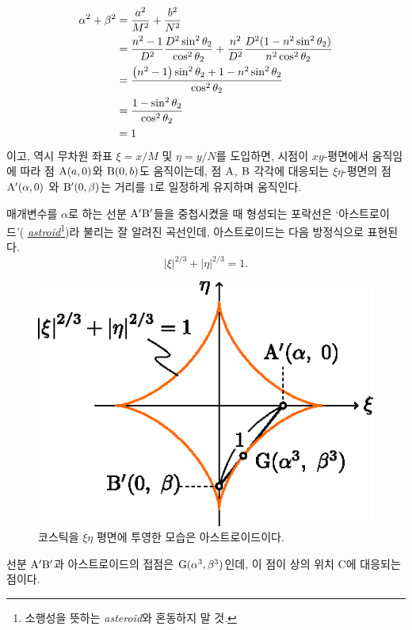 \documentclass[twocolumn]{article}
\begin{document}
$$ \begin{aligned}
	\greeka^2 + \greekb^2 &= \dfrac{\romana^2}{M^2}+\dfrac{\romanb^2}{N^2}\\
	&=\dfrac{n^2-1}{D^2}\dfrac{D^2\sin^2\theta_2}{\cos^2\theta_2}%
	+\dfrac{n^2}{D^2}\dfrac{D^2(1-n^2\sin^2\theta_2)}{n^2\cos^2\theta_2}\\
	&=\dfrac{\left(n^2-1\right)\sin^2\theta_2 + 1-n^2\sin^2\theta_2}
	{\cos^2\theta_2}\\
	&=\dfrac{1-\sin^2\theta_2}{\cos^2\theta_2}\\
	&= 1
\end{aligned}$$
%
이고, 역시 무차원 좌표 $\xi=x/M$ 및 $\eta=y/N$를 도입하면, 시점이 $xy$-평면에서 움직임에 따라 점 $\mathrm{{A}}({a}, 0)$와 $\mathrm{{B}}(0, {b})$도 움직이는데, 점 $\mathrm{{A}}$, $\mathrm{{B}}$ 각각에 대응되는  $\xi\eta$-평면의 점 $\mathrm{{A^{\prime}}}({\alpha}, 0)$
와 $\mathrm{{B^{\prime}}}(0, {\beta})$는 거리를 $1$로 일정하게 유지하며 움직인다.

매개변수를 $\alpha$로 하는 선분 ${\mathrm{{A^{\prime}}{B^{\prime}}}}$들을 중첩시켰을 때 형성되는 포락선은 `아스트로이드'(%
\href{https://en.wikipedia.org/wiki/Astroid}{\emph{astroid}}\footnote{
소행성을 뜻하는 \emph{asteroid}와 혼동하지 말 것.})라 불리는 잘 알려진 곡선인데, 아스트로이드는 다음 방정식으로 표현된다.
$$ \left| \xi \right|^{2/3} + \left| \eta \right|^{2/3} = 1. $$

\begin{figure}
	\centering
	\includegraphics{figs/g107.eps}	
	\caption{코스틱을 $\xi\eta$ 평면에 투영한 모습은 아스트로이드이다.}
	\label{fig:astroid}
\end{figure}

선분 ${\mathrm{{A^{\prime}}{B^{\prime}}}}$과
아스트로이드의 접점은 $\mathrm{G}({\alpha}^3, {\beta}^3)$인데, 이 점이 상의 위치 $\mathrm{C}$에 대응되는 점이다.
	
\end{document}
